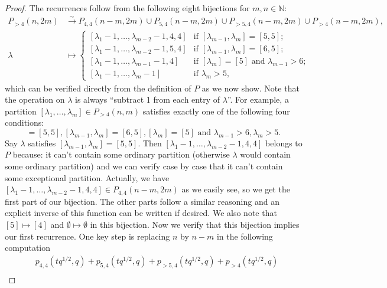 \documentclass[a4paper, 12pt, reqno]{amsart}
\theoremstyle{remark}
\numberwithin{equation}{subsection}
\begin{document}
\begin{proof}
  The recurrences follow from the following eight bijections for $m, n \in \mathbb{N}$:
  \begin{align*}
    P_{>4}(n, 2m) &\xrightarrow{\sim} P_{4, 4}(n - m, 2m) \cup P_{5, 4}(n - m, 2m) \cup P_{>5, 4}(n - m, 2m) \cup P_{>4}(n - m, 2m), \\
    \lambda &\mapsto
              \begin{cases}
                [\lambda_1 - 1, \dots, \lambda_{m - 2} - 1, 4, 4] &\text{if }[\lambda_{m - 1}, \lambda_m] = [5, 5]; \\
                [\lambda_1 - 1, \dots, \lambda_{m - 2} - 1, 5, 4] &\text{if }[\lambda_{m - 1}, \lambda_m] = [6, 5]; \\
                [\lambda_1 - 1, \dots, \lambda_{m - 1} - 1, 4] &\text{if }[\lambda_m] = [5]\text{ and }\lambda_{m - 1} > 6; \\
                [\lambda_1 - 1, \dots, \lambda_m - 1] &\text{if }\lambda_m > 5,
              \end{cases}
  \end{align*}
  which can be verified directly from the definition of $P$ as we now show.
  Note that the operation on $\lambda$ is always ``subtract 1 from each entry of $\lambda$''.
  For example, a partition $[\lambda_1, \dots, \lambda_m] \in P_{>4}(n, m)$ satisfies exactly one of the following four conditions:
  \begin{equation*}
    [\lambda_{m - 1}, \lambda_m] = [5, 5], [\lambda_{m - 1}, \lambda_m] = [6, 5], [\lambda_m] = [5]\text{ and }\lambda_{m - 1} > 6, \lambda_m > 5.
  \end{equation*}
  Say $\lambda$ satisfies $[\lambda_{m - 1}, \lambda_m] = [5, 5]$.
  Then $[\lambda_1 - 1, \dots, \lambda_{m - 2} - 1, 4, 4]$ belongs to $P$ because: it can't contain some ordinary partition (otherwise $\lambda$ would contain some ordinary partition) and we can verify case by case that it can't contain some exceptional partition.
  Actually, we have $[\lambda_1 - 1, \dots, \lambda_{m - 2} - 1, 4, 4] \in P_{4, 4}(n - m, 2m)$ as we easily see, so we get the first part of our bijection.
  The other parts follow a similar reasoning and an explicit inverse of this function can be written if desired.
  We also note that $[5] \mapsto [4]$ and $\emptyset \mapsto \emptyset$ in this bijection.
  Now we verify that this bijection implies our first recurrence.
  One key step is replacing $n$ by $n - m$ in the following computation
  \begin{align*}
    &p_{4, 4}(tq^{1/2}, q) + p_{5, 4}(tq^{1/2}, q) + p_{>5, 4}(tq^{1/2}, q) + p_{>4}(tq^{1/2}, q) \\

\end{align*}
\end{proof}
\end{document}
